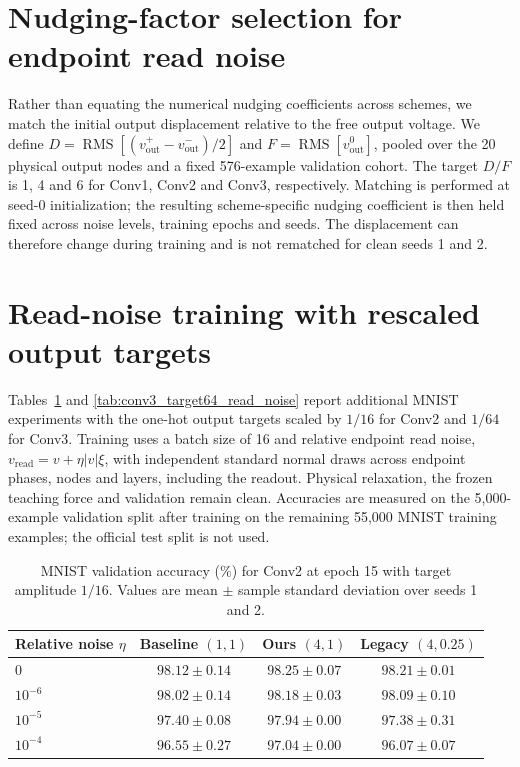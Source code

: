 \documentclass{article}
\begin{document}
\section{Nudging-factor selection for endpoint read noise}
\label{sec:supp_read_noise_nudging}
Rather than equating the numerical nudging coefficients across schemes, we match
the initial output displacement relative to the free output voltage. We define
$D=\operatorname{RMS}[(v_{\mathrm{out}}^+-v_{\mathrm{out}}^-)/2]$ and
$F=\operatorname{RMS}[v_{\mathrm{out}}^0]$, pooled over the 20 physical output
nodes and a fixed 576-example validation cohort. The target $D/F$ is 1, 4 and 6
for Conv1, Conv2 and Conv3, respectively. Matching is performed at seed-0
initialization; the resulting scheme-specific nudging coefficient is then held
fixed across noise levels, training epochs and seeds. The displacement can
therefore change during training and is not rematched for clean seeds 1 and 2.

\clearpage
\section{Read-noise training with rescaled output targets}
\label{sec:supp_rescaled_target_read_noise}

Tables~\ref{tab:conv2_target16_read_noise} and
\ref{tab:conv3_target64_read_noise} report additional MNIST experiments with
the one-hot output targets scaled by $1/16$ for Conv2 and $1/64$ for Conv3.
Training uses a batch size of 16 and relative endpoint read noise,
$v_{\mathrm{read}}=v+\eta |v|\xi$, with independent standard normal draws
across endpoint phases, nodes and layers, including the readout. Physical
relaxation, the frozen teaching force and validation remain clean. Accuracies
are measured on the 5,000-example validation split after training on the
remaining 55,000 MNIST training examples; the official test split is not used.

\begin{table}[htbp]
    \centering
    \caption{MNIST validation accuracy (\%) for Conv2 at epoch 15 with target
    amplitude $1/16$. Values are mean $\pm$ sample standard deviation over
    seeds 1 and 2.}
    \label{tab:conv2_target16_read_noise}
    \begin{tabular}{lccc}
        \toprule
        Relative noise $\eta$ & Baseline $(1,1)$ & Ours $(4,1)$ & Legacy $(4,0.25)$ \\
        \midrule
        $0$       & $98.12 \pm 0.14$ & $98.25 \pm 0.07$ & $98.21 \pm 0.01$ \\
        $10^{-6}$ & $98.02 \pm 0.14$ & $98.18 \pm 0.03$ & $98.09 \pm 0.10$ \\
        $10^{-5}$ & $97.40 \pm 0.08$ & $97.94 \pm 0.00$ & $97.38 \pm 0.31$ \\
        $10^{-4}$ & $96.55 \pm 0.27$ & $97.04 \pm 0.00$ & $96.07 \pm 0.07$ \\
        \bottomrule
    \end{tabular}
\end{table}
\end{document}
